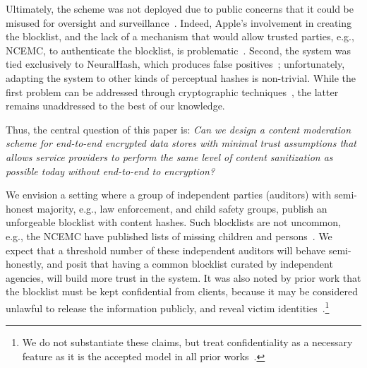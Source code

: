 Ultimately, the scheme was not deployed due to public concerns that it could be misused for oversight and surveillance~\cite{applePSIabandon}. Indeed, Apple's involvement in creating the
blocklist, and the lack of a mechanism that would allow trusted parties, e.g., NCEMC, to authenticate the blocklist, is problematic~\cite{applePSICriticBBC,
  applePSICriticBU}. Second, the system was tied exclusively to NeuralHash, which 
produces false positives~\cite{neuralHashAttack}; unfortunately, adapting the system to other kinds of perceptual hashes is non-trivial. While the first problem can be addressed through cryptographic techniques~\cite{scheffler2023public}, the latter remains unaddressed to the best of our knowledge. 


Thus, the central question of this paper is:
\emph{Can we design a content moderation scheme for end-to-end encrypted data stores with minimal trust assumptions that allows service providers to perform the same level of content sanitization as possible today without end-to-end to encryption?}









%
We envision a setting where a group of independent parties (auditors) with semi-honest majority, e.g., law enforcement, and child safety groups, publish an unforgeable blocklist with content hashes. Such blocklists are
not uncommon, e.g., the NCEMC have published lists of missing
children and persons~\cite{ncemc}. We 
expect that a threshold number of these independent auditors will behave semi-honestly, and posit that having a common blocklist curated by independent agencies, will build more trust in the system. It was also noted by prior work that the blocklist must be kept confidential from clients, because it may be considered unlawful to release the information publicly, and reveal victim identities~\cite{kulshrestha2021identifying,canetti2021broken}.\footnote{We do not substantiate these claims, but treat confidentiality as a necessary feature as it is the accepted model in all prior works~\cite{kulshrestha2021identifying,scheffler2023public,bhowmick2021apple}.} 


